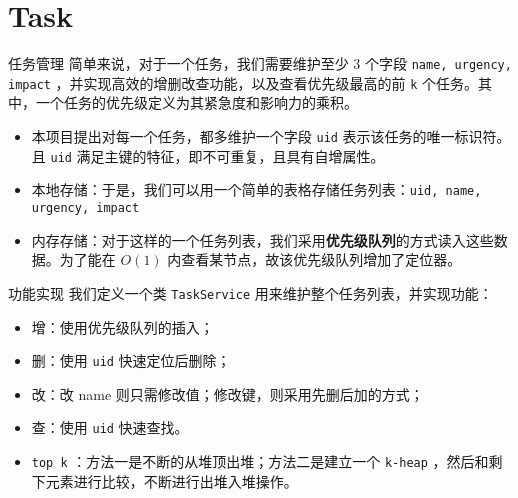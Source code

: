 \documentclass{beamer}
\begin{document}

\section{Task}

\begin{frame}{任务管理}
简单来说，对于一个任务，我们需要维护至少 3 个字段 \texttt{name, urgency, impact} ，并实现高效的增删改查功能，以及查看优先级最高的前 \texttt{k} 个任务。其中，一个任务的优先级定义为其紧急度和影响力的乘积。
\begin{itemize}
\item 本项目提出对每一个任务，都多维护一个字段 \texttt{uid} 表示该任务的唯一标识符。且 \texttt{uid} 满足主键的特征，即不可重复，且具有自增属性。
\item 本地存储：于是，我们可以用一个简单的表格存储任务列表：\texttt{uid, name, urgency, impact}
\item 内存存储：对于这样的一个任务列表，我们采用\textbf{优先级队列}的方式读入这些数据。为了能在 $O(1)$ 内查看某节点，故该优先级队列增加了定位器。
\end{itemize}
\end{frame}

\begin{frame}{功能实现}
我们定义一个类 \texttt{TaskService} 用来维护整个任务列表，并实现功能：
\begin{itemize}
\item 增：使用优先级队列的插入；
\item 删：使用 \texttt{uid} 快速定位后删除；
\item 改：改 name 则只需修改值；修改键，则采用先删后加的方式；
\item 查：使用 \texttt{uid} 快速查找。
\item \texttt{top k} ：方法一是不断的从堆顶出堆；方法二是建立一个 \texttt{k-heap} ，然后和剩下元素进行比较，不断进行出堆入堆操作。
\end{itemize}
\end{frame}
\end{document}
